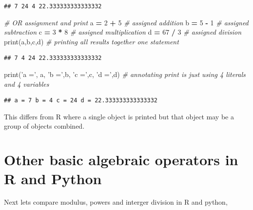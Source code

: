 \documentclass[]{book}
\newenvironment{Shaded}{\begin{snugshade}}{\end{snugshade}}
\newcommand{\DecValTok}[1]{\textcolor[rgb]{0.00,0.00,0.81}{#1}}
\newcommand{\StringTok}[1]{\textcolor[rgb]{0.31,0.60,0.02}{#1}}
\newcommand{\CommentTok}[1]{\textcolor[rgb]{0.56,0.35,0.01}{\textit{#1}}}
\newcommand{\OperatorTok}[1]{\textcolor[rgb]{0.81,0.36,0.00}{\textbf{#1}}}
\newcommand{\BuiltInTok}[1]{#1}
\newcommand{\NormalTok}[1]{#1}
\theoremstyle{definition}
\theoremstyle{definition}
\theoremstyle{definition}
\theoremstyle{remark}
\begin{document}
\begin{verbatim}
## 7 24 4 22.333333333333332
\end{verbatim}

\begin{Shaded}
\begin{Highlighting}[]
\CommentTok{# OR assignment and print}
\NormalTok{a }\OperatorTok{=} \DecValTok{2} \OperatorTok{+} \DecValTok{5}           \CommentTok{# assigned addition}
\NormalTok{b }\OperatorTok{=} \DecValTok{5} \OperatorTok{-} \DecValTok{1}           \CommentTok{# assigned subtraction}
\NormalTok{c }\OperatorTok{=} \DecValTok{3} \OperatorTok{*} \DecValTok{8}           \CommentTok{# assigned multiplication}
\NormalTok{d }\OperatorTok{=} \DecValTok{67} \OperatorTok{/} \DecValTok{3}          \CommentTok{# assigned division}
\BuiltInTok{print}\NormalTok{(a,b,c,d)      }\CommentTok{# printing all results together one statement}
\end{Highlighting}
\end{Shaded}

\begin{verbatim}
## 7 4 24 22.333333333333332
\end{verbatim}

\begin{Shaded}
\begin{Highlighting}[]
\BuiltInTok{print}\NormalTok{(}\StringTok{'a ='}\NormalTok{, a, }\StringTok{'b ='}\NormalTok{,b, }\StringTok{'c ='}\NormalTok{,c, }\StringTok{'d ='}\NormalTok{,d) }\CommentTok{# annotating print is just using 4 literals and 4 variables}
\end{Highlighting}
\end{Shaded}

\begin{verbatim}
## a = 7 b = 4 c = 24 d = 22.333333333333332
\end{verbatim}

This differs from R where a single object is printed but that object may
be a group of objects combined.

\section{Other basic algebraic operators in R and
Python}\label{other-basic-algebraic-operators-in-r-and-python}

Next lets compare modulus, powers and interger division in R and python,

\begin{Shaded}
\end{Shaded}
\end{document}
